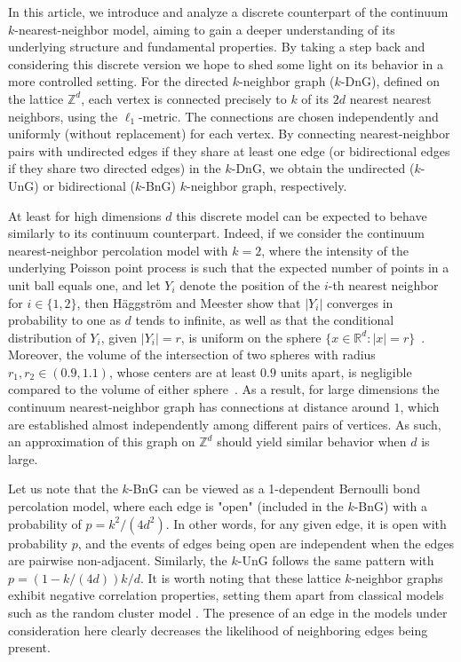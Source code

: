 \documentclass[a4paper, oneside, 11pt]{amsart}
\theoremstyle{definition}
\newcommand{\1}{\mathbbm{1}}
\newcommand{\0}{\mathbf{o}}
\newcommand{\R}{\mathbb{R}}
\newcommand{\Z}{\mathbb{Z}}
\numberwithin{equation}{section}
\begin{document}
In this article, we introduce and analyze a discrete counterpart of the continuum $k$-nearest-neighbor model, aiming to gain a deeper understanding of its underlying structure and fundamental properties. By taking a step back and considering this discrete version we hope to shed some light on its behavior in a more controlled setting. 
For the directed $k$-neighbor graph ($k$-DnG), defined on the lattice $\mathbb{Z}^d$, each vertex is connected precisely to $k$ of its $2d$ nearest nearest neighbors, using the $\ell_1$-metric. The connections are chosen independently and uniformly (without replacement) for each vertex. By connecting nearest-neighbor pairs with undirected edges if they share at least one edge (or bidirectional edges if they share two directed edges) in the $k$-DnG, we obtain the undirected ($k$-UnG) or bidirectional ($k$-BnG) $k$-neighbor graph, respectively.

At least for high dimensions $d$ this discrete model can be expected to behave similarly to its continuum counterpart.
Indeed, if we consider the continuum nearest-neighbor percolation model with $k=2$, where the intensity of the underlying Poisson point process is such that the expected number of points in a unit ball equals one, and let $Y_i$ denote the position of the $i$-th nearest neighbor for $i\in\{1,2\}$, then H\"aggström and Meester show that $|Y_i|$ converges in probability to one as $d$ tends to infinite, as well as that the conditional distribution of $Y_i$, given $|Y_i|=r$, is uniform on the sphere $\{x\in \R^d: |x|=r\}$~\cite[Lemma $3.2$]{HaggMee96}. Moreover, the volume of the intersection of two spheres with radius $r_1,r_2\in(0.9,1.1)$, whose centers are at least $0.9$ units apart, is negligible compared to the volume of either sphere~\cite[Lemma $3.3$]{HaggMee96}. As a result, for large dimensions the continuum nearest-neighbor graph has connections at distance around $1$, which are established almost independently among different pairs of vertices. As such, an approximation of this graph on $\Z^d$ should yield similar behavior when $d$ is large. 

Let us note that the $k$-BnG can be viewed as a 1-dependent Bernoulli bond percolation model, where each edge is "open" (included in the $k$-BnG) with a probability of $p = k^2/(4d^2)$. In other words, for any given edge, it is open with probability $p$, and the events of edges being open are independent when the edges are pairwise non-adjacent. Similarly, the $k$-UnG follows the same pattern with $p = (1-k/(4d))k/d$. It is worth noting that these lattice $k$-neighbor graphs exhibit negative correlation properties, setting them apart from classical models such as the random cluster model \cite{grimmett2006random}. The presence of an edge in the models under consideration here clearly decreases the likelihood of neighboring edges being present.
\end{document}
